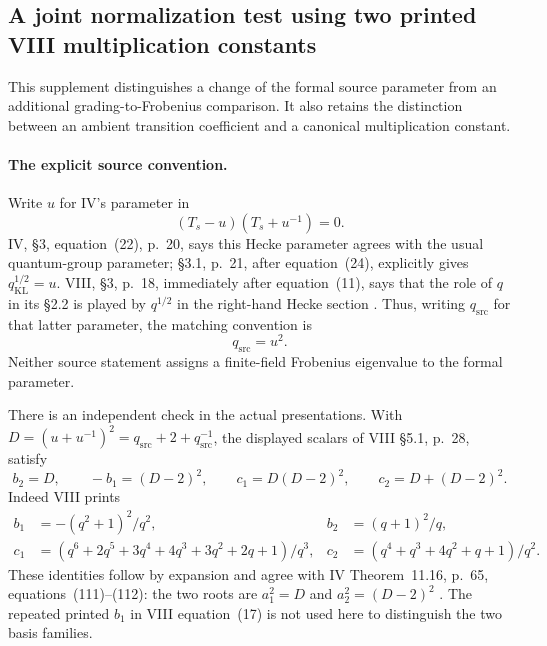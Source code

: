\subsection{A joint normalization test using two printed VIII multiplication constants}

This supplement distinguishes a change of the formal source
parameter from an additional grading-to-Frobenius comparison.
It also retains the distinction between an ambient transition
coefficient and a canonical multiplication constant.

\paragraph{The explicit source convention.}
Write \(u\) for IV's parameter in
\[
                     (T_s-u)(T_s+u^{-1})=0.
\]
IV, \S3, equation~(22), p.~20, says this Hecke parameter agrees
with the usual quantum-group parameter; \S3.1, p.~21, after
equation~(24), explicitly gives \(q_{\mathrm{KL}}^{1/2}=u\).
VIII, \S3, p.~18, immediately after equation~(11), says that
the role of \(q\) in its \S2.2 is played by \(q^{1/2}\)
in the right-hand Hecke section \cite{IV,VIII}.
Thus, writing \(q_{\mathrm{src}}\) for that latter parameter,
the matching convention is
\begin{equation}\label{eq:jointSourceParameter}
                          q_{\mathrm{src}}=u^2.
\end{equation}
Neither source statement assigns a finite-field Frobenius
eigenvalue to the formal parameter.

There is an independent check in the actual presentations.
With \(D=(u+u^{-1})^2=q_{\mathrm{src}}+2+q_{\mathrm{src}}^{-1}\),
the displayed scalars of VIII \S5.1, p.~28, satisfy
\[
 b_2=D,\qquad -b_1=(D-2)^2,\qquad
 c_1=D(D-2)^2,\qquad c_2=D+(D-2)^2.
\]
Indeed VIII prints
\[
\begin{aligned}
 b_1&=-(q^2+1)^2/q^2,& b_2&=(q+1)^2/q,\\
 c_1&=(q^6+2q^5+3q^4+4q^3+3q^2+2q+1)/q^3,&
 c_2&=(q^4+q^3+4q^2+q+1)/q^2.
\end{aligned}
\]
These identities follow by expansion and agree with IV
Theorem~11.16, p.~65, equations~(111)--(112):
the two roots are \(a_1^2=D\) and \(a_2^2=(D-2)^2\)
\cite{IV,VIII}.
The repeated printed \(b_1\) in VIII equation~(17) is not
used here to distinguish the two basis families.

